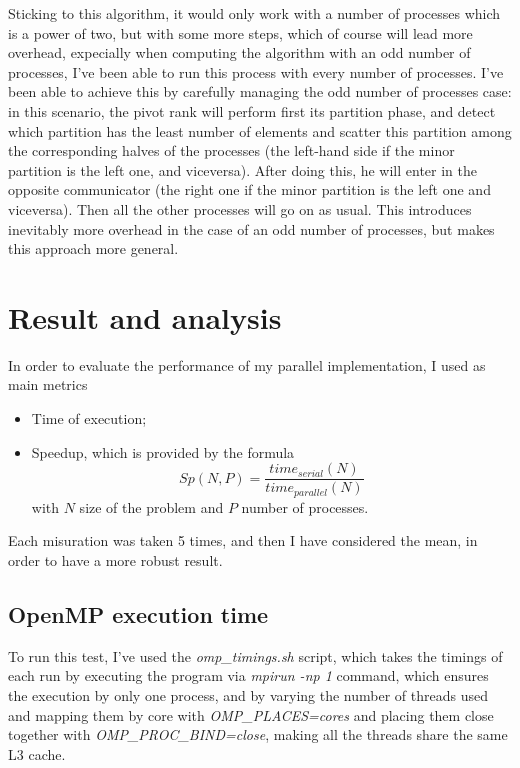 \documentclass{article}
\begin{document}
	
	Sticking to this algorithm, it would only work with a number of processes which is a power of two, but with some more steps, which of course will lead more overhead, expecially when computing the algorithm with an odd number of processes, I've been able to run this process with every number of processes. I've been able to achieve this by carefully managing the odd number of processes case: in this scenario, the pivot rank will perform first its partition phase, and detect which partition has the least number of elements and scatter this partition among the corresponding halves of the processes (the left-hand side if the minor partition is the left one, and viceversa). After doing this, he will enter in the opposite communicator (the right one if the minor partition is the left one and viceversa). Then all the other processes will go on as usual.
	This introduces inevitably more overhead in the case of an odd number of processes, but makes this approach more general.
	
	\section{Result and analysis}
	
	In order to evaluate the performance of my parallel implementation, I used as main metrics 
	\begin{itemize}
		\item Time of execution;
		\item Speedup, which is provided by the formula $$Sp(N,P)=\frac{time_{serial}(N)}{time_{parallel}(N)}$$ with $N$ size of the problem and $P$ number of processes.
	\end{itemize}
	
	Each misuration was taken 5 times, and then I have considered the mean, in order to have a more robust result.
	
	\subsection{OpenMP execution time}
	
	To run this test, I've used the \textit{omp\_timings.sh} script, which takes the timings of each run by executing the program via \textit{mpirun -np 1} command, which ensures the execution by only one process, and by varying the number of threads used and mapping them by core with \textit{OMP\_PLACES=cores} and placing them close together with \textit{OMP\_PROC\_BIND=close}, making all the threads share the same L3 cache. 
	
\end{document}
